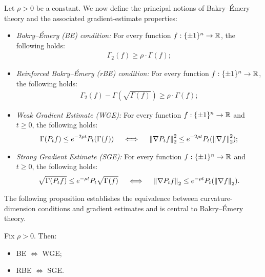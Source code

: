 Let $\rho > 0$ be a constant. We now define the principal notions of Bakry--\'Emery theory and the associated gradient-estimate properties:
\begin{itemize}
    \item \emph{Bakry--\'Emery (BE) condition:} For every function $f: \{\pm 1\}^n \to \mathbb{R}$, the following holds:
    \begin{align*}
        \Gamma_2(f) \geq \rho \cdot \Gamma(f);
    \end{align*}

    \item \emph{Reinforced Bakry--\'Emery (rBE) condition:} For every function $f: \{\pm 1\}^n \to \mathbb{R}$, the following holds:
    \begin{align}
        \Gamma_2(f) - \Gamma(\sqrt{\Gamma(f)}) \ge \rho \cdot \Gamma(f);
    \end{align}

    \item \emph{Weak Gradient Estimate (WGE):} For every function $f:\{\pm 1\}^n \to \mathbb{R}$ and $t\geq 0$, the following holds:
    \begin{align}
        \Gamma(P_t f) \leq e^{-2\rho t} P_t(\Gamma(f)) \quad\iff\quad \left\lVert \nabla P_t f \right\rVert^2_2 \leq e^{-2\rho t} P_t(\left\lVert \nabla f \right\rVert^2_2);
    \end{align}

    \item \emph{Strong Gradient Estimate (SGE):} For every function $f: \{\pm 1\}^n \to \mathbb{R}$ and $t\geq 0$, the following holds:
    \begin{align}\label{eq:SGE-intro}
        \sqrt{\Gamma(P_t f)} \leq e^{-\rho t} P_t \sqrt{\Gamma(f)} \quad\iff\quad 
        \left\lVert \nabla P_t f \right\rVert_2 \leq e^{-\rho t} P_t(\left\lVert \nabla f \right\rVert_2).
    \end{align}
\end{itemize}

The following proposition establishes the equivalence between curvature-dimension conditions and gradient estimates and is central to Bakry--\'Emery theory.

\begin{proposition}\label{prop:intro-BE-GE}
    Fix $\rho > 0$. Then:
    \begin{itemize}
        \item BE $\Leftrightarrow$ WGE;
        \item RBE $\Leftrightarrow$ SGE.
    \end{itemize}
\end{proposition}

